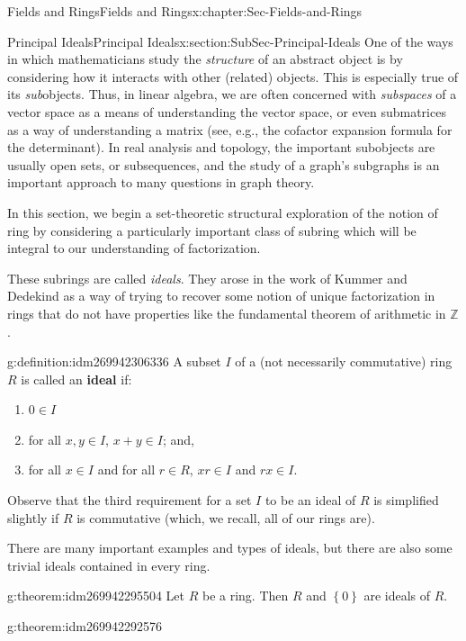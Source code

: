 \documentclass[oneside,10pt,]{book}
\newcommand{\terminology}[1]{\textbf{#1}}
\numberwithin{equation}{section}
\newcommand{\set}[1]{\left\{ {#1} \right\}}
\def\Z{{\mathbb Z}}
\begin{document}
\begin{chapterptx}{Fields and Rings}{}{Fields and Rings}{}{}{x:chapter:Sec-Fields-and-Rings}
\typeout{************************************************}
%
\begin{sectionptx}{Principal Ideals}{}{Principal Ideals}{}{}{x:section:SubSec-Principal-Ideals}
One of the ways in which mathematicians study the \emph{structure} of an abstract object is by considering how it interacts with other (related) objects. This is especially true of its \emph{sub}objects. Thus, in linear algebra, we are often concerned with \emph{subspaces} of a vector space as a means of understanding the vector space, or even submatrices as a way of understanding a matrix (see, e.g., the cofactor expansion formula for the determinant). In real analysis and topology, the important subobjects are usually open sets, or subsequences, and the study of a graph's subgraphs is an important approach to many questions in graph theory.%
\par
In this section, we begin a set-theoretic structural exploration of the notion of ring by considering a particularly important class of subring which will be integral to our understanding of factorization.%
\par
These subrings are called \emph{ideals}. They arose in the work of Kummer and Dedekind as a way of trying to recover some notion of unique factorization in rings that do not have properties like the fundamental theorem of arithmetic in \(\Z\).%
\begin{definition}{}{g:definition:idm269942306336}%
A subset \(I\) of a (not necessarily commutative) ring \(R\) is called an \terminology{ideal} if:%
\begin{enumerate}
\item{}\(0\in I\)%
\item{}for all \(x,y\in I\), \(x+y\in I\); and,%
\item{}for all \(x\in I\) and for all \(r\in R\), \(xr\in I\) and \(rx\in I\).%
\end{enumerate}
%
\end{definition}
Observe that the third requirement for a set \(I\) to be an ideal of \(R\) is simplified slightly if \(R\) is commutative (which, we recall, all of our rings are).%
\par
There are many important examples and types of ideals, but there are also some trivial ideals contained in every ring.%
\begin{theorem}{}{}{g:theorem:idm269942295504}%
Let \(R\) be a ring. Then \(R\) and \(\set{0}\) are ideals of \(R\).%
\end{theorem}
\begin{theorem}{}{}{g:theorem:idm269942292576}%

\end{theorem}
\end{sectionptx}
\end{chapterptx}
\end{document}
